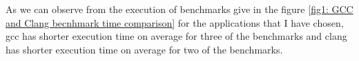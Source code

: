 \documentclass[16pt]{article}
\begin{document}
    As we can observe from the execution of benchmarks give in the figure \ref{fig1: GCC and Clang becnhmark time comparison} for the applications that I have chosen, gcc has shorter execution time on average for three of the benchmarks and clang has shorter execution time on average for two of the benchmarks.
    \printbibliography
\end{document}
